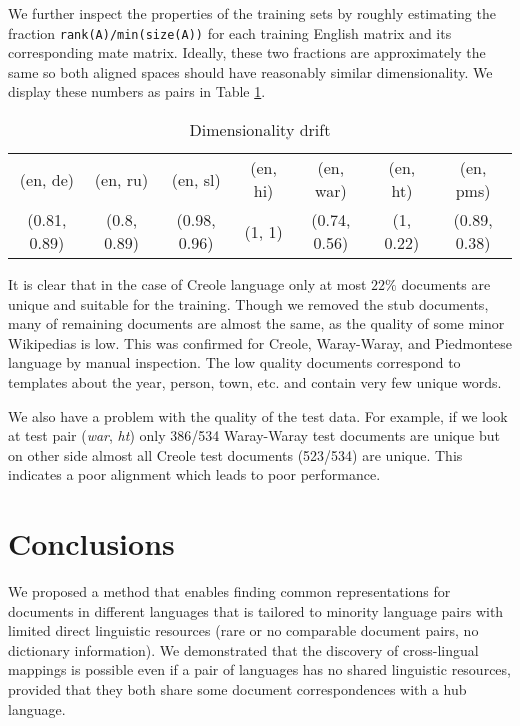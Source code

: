 \documentclass{article} %
\begin{document}
We further inspect the properties of the training sets by roughly estimating the fraction \texttt{rank(A)/min(size(A))} for each training English matrix and its corresponding mate matrix.
Ideally, these two fractions are approximately the same so  both aligned spaces should have reasonably similar
dimensionality.
We display these numbers as pairs in Table \ref{table:rank}.
\begin{table}[h]
\caption{Dimensionality drift}
\label{table:rank}
\begin{tabular}{|c|c|c|c|c|c|c|}
\cline{1-7}
(en, de)     &   (en, ru)     &   (en, sl)       &     (en, hi)&   (en, war)      &      (en, ht) &   (en, pms)\\
\cline{1-7}
(0.81, 0.89)   &  (0.8, 0.89)  &   (0.98, 0.96)    &    (1, 1)  &   (0.74, 0.56)  &      (1, 0.22)  &   (0.89, 0.38)\\
\cline{1-7}
\end{tabular}
\end{table}
It is clear that in the case of Creole language only at most $22\%$ documents are unique and suitable for the training.
Though we removed the stub documents, many of remaining documents are almost the same, as the quality of some minor Wikipedias is low. This was confirmed for Creole, Waray-Waray, and Piedmontese language
by manual inspection. The low quality documents correspond to templates about the year, person, town, etc. and contain very few unique words.


We also have a problem with the quality of the test data. For example, if we look at test pair (\emph{war}, \emph{ht}) only 386/534 Waray-Waray test documents are unique but on other side
almost all Creole test documents (523/534) are unique. This indicates a poor alignment which leads to poor performance.





\section{Conclusions}
We proposed a method that enables finding common representations for documents in different languages that is tailored
to minority language pairs with limited direct linguistic resources (rare or no comparable document pairs, no dictionary information). We demonstrated that the discovery of cross-lingual mappings is possible even if a pair of languages has no shared linguistic resources, provided that they both share some document correspondences with a hub language.
\end{document}
